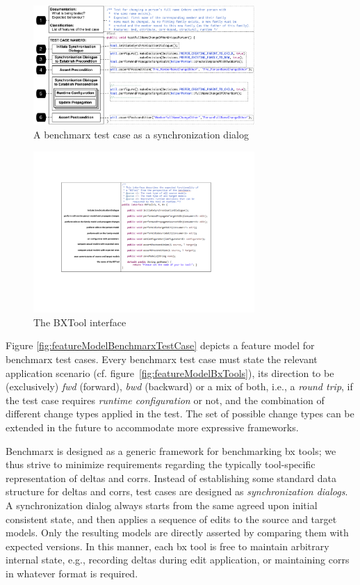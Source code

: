\begin{figure}[tb]
	\centering
	\includegraphics[width=0.75\textwidth]{diagrams/benchmarx/testCase}
	\caption{A benchmarx test case as a synchronization dialog}
	\label{fig:benchmarxTestCase}
\end{figure}

\begin{figure}[bt]
	\centering
	\includegraphics[width=0.75\textwidth]{diagrams/benchmarx/BXTool}
	\caption{The BXTool interface}
	\label{fig:refImplementation}
\end{figure}

Figure \ref{fig:featureModelBenchmarxTestCase} depicts a feature model for benchmarx test cases. 
Every benchmarx test case must state the relevant application scenario (cf. figure~\ref{fig:featureModelBxTools}), its direction to be (exclusively) \emph{fwd} (forward), \emph{bwd} (backward) or a mix of both, i.e., a \emph{round trip}, if the test case requires \emph{runtime configuration} or not, and the combination of different change types applied in the test. 
The set of possible change types can be extended in the future to accommodate more expressive frameworks. 

Benchmarx is designed as a generic framework for benchmarking bx tools; we thus strive to minimize requirements regarding the typically tool-specific representation of deltas and corrs. 
Instead of establishing some standard data structure for deltas and corrs, test cases are designed as \emph{synchronization dialogs}. 
A synchronization dialog always starts from the same agreed upon initial consistent state, and then applies a sequence of edits to the source and target models. 
Only the resulting models are directly asserted by comparing them with expected versions.
In this manner, each bx tool is free to maintain arbitrary internal state, e.g., recording deltas during edit application, or maintaining corrs in whatever format is required.

